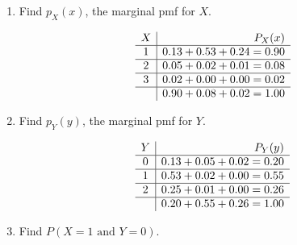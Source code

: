     \begin{enumerate}[label=(\alph*)]
        \item Find $p_{X}(x)$, the marginal pmf for $X$.
        
        \begin{mdframed}
            \begin{center}
                \begin{equation*}
                    \begin{array}{c | r}
                        X & P_{X}(x)  \\
                        \hline
                        1 & 0.13 + 0.53 + 0.24 = 0.90   \\
                        \hline
                        2 & 0.05 + 0.02 + 0.01 = 0.08   \\
                        \hline
                        3 & 0.02 + 0.00 + 0.00 = 0.02   \\
                        \hline
                          & 0.90 + 0.08 + 0.02 = 1.00
                    \end{array}
                \end{equation*}
            \end{center}
        \end{mdframed}

        \item Find $p_{Y}(y)$, the marginal pmf for $Y$.
        
        \begin{mdframed}
            \begin{equation*}
                \begin{array}{c | r}
                    Y & P_{Y}(y)  \\
                    \hline
                    0 & 0.13 + 0.05 + 0.02 = 0.20   \\
                    \hline
                    1 & 0.53 + 0.02 + 0.00 = 0.55   \\
                    \hline
                    2 & 0.25 + 0.01 + 0.00 = 0.26   \\
                    \hline
                      & 0.20 + 0.55 + 0.26 = 1.00
                \end{array}
            \end{equation*}
        \end{mdframed}

        \item Find $P(X = 1 \text { and } Y = 0)$.
        

\end{enumerate}
